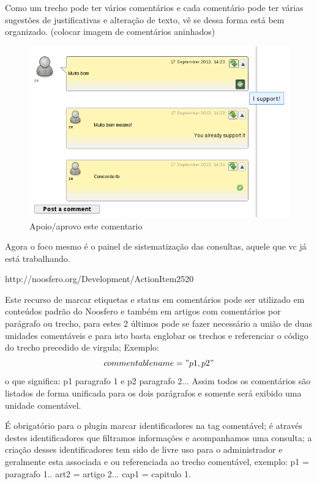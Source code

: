 \documentclass[12pt]{article}
\begin{document}
Como um trecho pode ter vários comentários e cada comentário pode ter várias
sugestões de justificativas e alteração de texto, vê se dessa forma está bem
organizado. (colocar imagem de comentários aninhados)

\begin{figure}[h]
\center
\includegraphics[scale=0.5]{support-on-comment.png}
\caption{Apoio/aprovo este comentario}
\label{support-on-comment}
\end{figure}

Agora o foco mesmo é o painel de sistematização das consultas, aquele que vc já está trabalhando.

http://noosfero.org/Development/ActionItem2520

Este recurso de marcar etiquetas e status em comentários pode ser utilizado em
conteúdos padrão do Noosfero e também em artigos com comentários por parágrafo
ou trecho, para estes 2 últimos pode se fazer necessário a união de duas
unidades comentáveis e para isto basta englobar os trechos e referenciar o
código do trecho precedido de virgula; Exemplo: \[commentable name="p1,p2"\] o
que significa: p1 paragrafo 1 e p2 paragrafo 2... Assim todos os comentários
são listados de forma unificada para os dois parágrafos e somente será exibido
uma unidade comentável.


É obrigatório para o plugin marcar identificadores na tag comentável; é
através destes identificadores que filtramos informações e acompanhamos uma
consulta; a criação desses identificadores tem sido de livre uso para o
administrador e geralmente esta associada e ou referenciada ao trecho
comentável, exemplo: p1 = paragrafo 1.. art2 = artigo 2... cap1 = capitulo 1.
\end{document}
